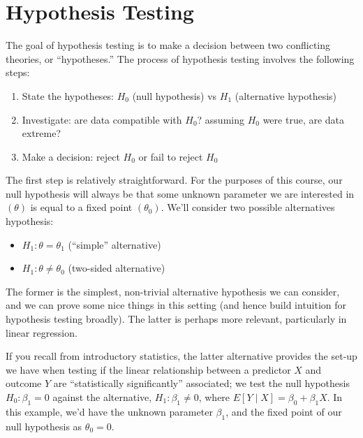 \documentclass[
  letterpaper,
  DIV=11,
  numbers=noendperiod]{scrreprt}
\begin{document}
\hypertarget{hypothesis-testing}{%
\chapter{Hypothesis Testing}\label{hypothesis-testing}}

The goal of hypothesis testing is to make a decision between two
conflicting theories, or ``hypotheses.'' The process of hypothesis
testing involves the following steps:

\begin{enumerate}
\def\labelenumi{\arabic{enumi}.}
\item
  State the hypotheses: \(H_0\) (null hypothesis) vs \(H_1\)
  (alternative hypothesis)
\item
  Investigate: are data compatible with \(H_0\)? assuming \(H_0\) were
  true, are data extreme?
\item
  Make a decision: reject \(H_0\) or fail to reject \(H_0\)
\end{enumerate}

The first step is relatively straightforward. For the purposes of this
course, our null hypothesis will always be that some unknown parameter
we are interested in \((\theta)\) is equal to a fixed point
\((\theta_0)\). We'll consider two possible alternatives hypothesis:

\begin{itemize}
\item
  \(H_1: \theta = \theta_1\) (``simple'' alternative)
\item
  \(H_1: \theta \neq \theta_0\) (two-sided alternative)
\end{itemize}

The former is the simplest, non-trivial alternative hypothesis we can
consider, and we can prove some nice things in this setting (and hence
build intuition for hypothesis testing broadly). The latter is perhaps
more relevant, particularly in linear regression.

If you recall from introductory statistics, the latter alternative
provides the set-up we have when testing if the linear relationship
between a predictor \(X\) and outcome \(Y\) are ``statistically
significantly'' associated; we test the null hypothesis
\(H_0: \beta_1 = 0\) against the alternative, \(H_1: \beta_1 \neq 0\),
where \(E[Y \mid X] = \beta_0 + \beta_1 X\). In this example, we'd have
the unknown parameter \(\beta_1\), and the fixed point of our null
hypothesis as \(\theta_0 = 0\).
\end{document}
